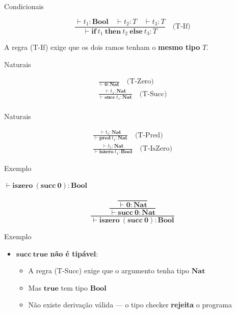 \begin{frame}{Condicionais}

    \[\frac{
    \vdash t_1 : \mathbf{Bool} \quad
    \vdash t_2 : T \quad
    \vdash t_3 : T
    }{
    \vdash \mathbf{if}\ t_1\ \mathbf{then}\ t_2\ \mathbf{else}\ t_3 : T
    } \quad\text{(T-If)}\]

    A regra (T-If) exige que os dois ramos tenham o \textbf{mesmo tipo}
    \(T\).
\end{frame}

\begin{frame}{Naturais}

    \[
    \begin{array}{c}
        \frac{}{\vdash \mathbf{0} : \mathbf{Nat}} \quad\text{(T-Zero)}\\
        \frac{\vdash t_1 : \mathbf{Nat}}{\vdash \mathbf{succ}\ t_1 : \mathbf{Nat}} \quad\text{(T-Succ)}\\
    \end{array}
    \]
\end{frame}

\begin{frame}{Naturais}

    \[
    \begin{array}{c}
        \frac{\vdash t_1 : \mathbf{Nat}}{\vdash \mathbf{pred}\ t_1 : \mathbf{Nat}} \quad\text{(T-Pred)}\\
        \frac{\vdash t_1 : \mathbf{Nat}}{\vdash \mathbf{iszero}\ t_1 : \mathbf{Bool}} \quad\text{(T-IsZero)}
    \end{array}\]
\end{frame}

\begin{frame}{Exemplo}

    \(\vdash \mathbf{iszero}\ (\mathbf{succ}\ \mathbf{0}) : \mathbf{Bool}\)

    \[\dfrac{
    \dfrac{
    \dfrac{}{\vdash \mathbf{0} : \mathbf{Nat}}
    }{\vdash \mathbf{succ}\ \mathbf{0} : \mathbf{Nat}}
    }{\vdash \mathbf{iszero}\ (\mathbf{succ}\ \mathbf{0}) : \mathbf{Bool}}\]
\end{frame}

\begin{frame}{Exemplo}

    \begin{itemize}

        \item
        \(\mathbf{succ}\ \mathbf{true}\) \textbf{não é tipável}:

        \begin{itemize}

            \item
            A regra (T-Succ) exige que o argumento tenha tipo \(\mathbf{Nat}\)
            \item
            Mas \(\mathbf{true}\) tem tipo \(\mathbf{Bool}\)
            \item
            Não existe derivação válida --- o tipo checker \textbf{rejeita} o
            programa
        \end{itemize}
    \end{itemize}
\end{frame}

